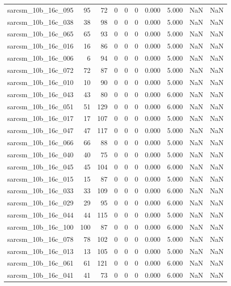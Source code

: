 \documentclass{article}
\begin{document}
\begin{longtable}{lrrrrrrrrr}
sarcsm\_10b\_16c\_095 & 95 & 72 & 0 & 0 & 0 & 0.000 & 5.000 & NaN & NaN \\
sarcsm\_10b\_16c\_038 & 38 & 98 & 0 & 0 & 0 & 0.000 & 5.000 & NaN & NaN \\
sarcsm\_10b\_16c\_065 & 65 & 93 & 0 & 0 & 0 & 0.000 & 5.000 & NaN & NaN \\
sarcsm\_10b\_16c\_016 & 16 & 86 & 0 & 0 & 0 & 0.000 & 5.000 & NaN & NaN \\
sarcsm\_10b\_16c\_006 & 6 & 94 & 0 & 0 & 0 & 0.000 & 5.000 & NaN & NaN \\
sarcsm\_10b\_16c\_072 & 72 & 87 & 0 & 0 & 0 & 0.000 & 5.000 & NaN & NaN \\
sarcsm\_10b\_16c\_010 & 10 & 90 & 0 & 0 & 0 & 0.000 & 5.000 & NaN & NaN \\
sarcsm\_10b\_16c\_043 & 43 & 80 & 0 & 0 & 0 & 0.000 & 6.000 & NaN & NaN \\
sarcsm\_10b\_16c\_051 & 51 & 129 & 0 & 0 & 0 & 0.000 & 6.000 & NaN & NaN \\
sarcsm\_10b\_16c\_017 & 17 & 107 & 0 & 0 & 0 & 0.000 & 5.000 & NaN & NaN \\
sarcsm\_10b\_16c\_047 & 47 & 117 & 0 & 0 & 0 & 0.000 & 5.000 & NaN & NaN \\
sarcsm\_10b\_16c\_066 & 66 & 88 & 0 & 0 & 0 & 0.000 & 5.000 & NaN & NaN \\
sarcsm\_10b\_16c\_040 & 40 & 75 & 0 & 0 & 0 & 0.000 & 5.000 & NaN & NaN \\
sarcsm\_10b\_16c\_045 & 45 & 104 & 0 & 0 & 0 & 0.000 & 6.000 & NaN & NaN \\
sarcsm\_10b\_16c\_015 & 15 & 87 & 0 & 0 & 0 & 0.000 & 5.000 & NaN & NaN \\
sarcsm\_10b\_16c\_033 & 33 & 109 & 0 & 0 & 0 & 0.000 & 6.000 & NaN & NaN \\
sarcsm\_10b\_16c\_029 & 29 & 95 & 0 & 0 & 0 & 0.000 & 6.000 & NaN & NaN \\
sarcsm\_10b\_16c\_044 & 44 & 115 & 0 & 0 & 0 & 0.000 & 5.000 & NaN & NaN \\
sarcsm\_10b\_16c\_100 & 100 & 87 & 0 & 0 & 0 & 0.000 & 6.000 & NaN & NaN \\
sarcsm\_10b\_16c\_078 & 78 & 102 & 0 & 0 & 0 & 0.000 & 5.000 & NaN & NaN \\
sarcsm\_10b\_16c\_013 & 13 & 105 & 0 & 0 & 0 & 0.000 & 5.000 & NaN & NaN \\
sarcsm\_10b\_16c\_061 & 61 & 121 & 0 & 0 & 0 & 0.000 & 6.000 & NaN & NaN \\
sarcsm\_10b\_16c\_041 & 41 & 73 & 0 & 0 & 0 & 0.000 & 6.000 & NaN & NaN \\

\end{longtable}
\end{document}
